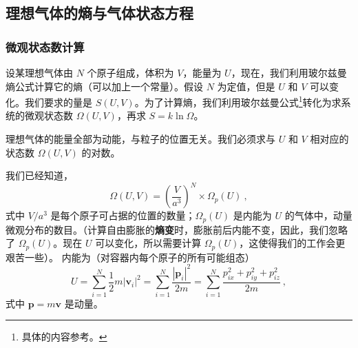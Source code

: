 

\subsection{理想气体的熵与气体状态方程}
\subsubsection{微观状态数计算}
设某理想气体由 $N $ 个原子组成，体积为 $V$，能量为 $U$，现在，我们利用玻尔兹曼熵公式计算它的熵（可以加上一个常量）。假设 $N $ 为定值，但是 $U $ 和 $V $ 可以变化。我们要求的量是 $S(U,V)$。为了计算熵，我们利用玻尔兹曼公式\footnote{具体的内容参考。}转化为求系统的微观状态数 $\Omega(U,V)$，再求 $S=k\ln \Omega$。

理想气体的能量全部为动能，与粒子的位置无关。我们必须求与 $U$ 和 $V$ 相对应的状态数 $\Omega(U,V)$ 的对数。

我们已经知道，
\begin{equation}
\Omega \left( U,V \right) =\left( \frac{V}{a^3} \right) ^N\times \Omega _p\left( U \right) ~,
\end{equation}
式中 $V/a^3$ 是每个原子可占据的位置的数量；$\Omega_p(U)$ 是内能为 $U$ 的气体中，动量微观分布的数目。（计算自由膨胀的\textbf{熵变}时，膨胀前后内能不变，因此，我们忽略了 $\Omega_p(U)$。现在 $U$ 可以变化，所以需要计算 $\Omega_p(U)$，这使得我们的工作会更艰苦一些）。
内能为（对容器内每个原子的所有可能组态）
\begin{equation}
U=\sum_{i=1}^N{\frac{1}{2}m\left| \boldsymbol{v}_i \right|^2}=\sum_{i=1}^N{\frac{\left| \boldsymbol{p}_i \right|^2}{2m}}=\sum_{i=1}^N{\frac{p_{ix}^{2}+p_{iy}^{2}+p_{iz}^{2}}{2m}}~,
\end{equation}
式中 $\boldsymbol p = m\boldsymbol v$ 是动量。

